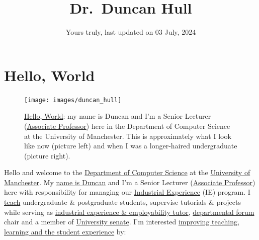 \documentclass[
  12pt,
]{book}
\title{Dr.~Duncan Hull}
\author{Yours truly, last updated on 03 July, 2024}
\date{}
\begin{document}
\maketitle

{
\setcounter{tocdepth}{1}
\tableofcontents
}
\hypertarget{hello-world}{%
\chapter*{Hello, World}\label{hello-world}}

\begin{figure}

{\centering \texttt{[image: images/duncan\_hull]} 

}

\caption{\href{https://en.wikipedia.org/wiki/Hello,_World}{Hello, World}: my name is Duncan and I'm a Senior Lecturer (\href{https://en.wikipedia.org/wiki/Associate_professor}{Associate Professor}) here in the Department of Computer Science at the University of Manchester. This is approximately what I look like now (picture left) and when I was a longer-haired undergraduate (picture right).}\label{fig:unsplashed-fig}
\end{figure}



Hello and welcome to the \href{https://www.cs.manchester.ac.uk/}{Department of Computer Science} at the \href{https://www.manchester.ac.uk}{University of Manchester}. My \href{https://en.wikipedia.org/wiki/Duncan_(given_name)}{name is Duncan} and I'm a Senior Lecturer (\href{https://en.wikipedia.org/wiki/Associate_professor}{Associate Professor}) here with responsibility for managing our \href{https://www.cs.manchester.ac.uk/study/undergraduate/industrial-experience/}{Industrial Experience} (IE) program. I \href{https://personalpages.manchester.ac.uk/staff/duncan.hull/teaching}{teach} undergraduate \& postgraduate students, supervise tutorials \& projects while serving as \href{http://studentnet.cs.manchester.ac.uk/employment/placement/}{industrial experience \& employability tutor}, \href{https://bit.ly/cs-departmental-forum}{departmental forum} chair and a member of \href{https://www.manchester.ac.uk/discover/governance/structure/senate/}{University senate}. I'm interested \href{https://personalpages.manchester.ac.uk/staff/duncan.hull/research.html}{improving teaching, learning and the student experience} by:
\end{document}
